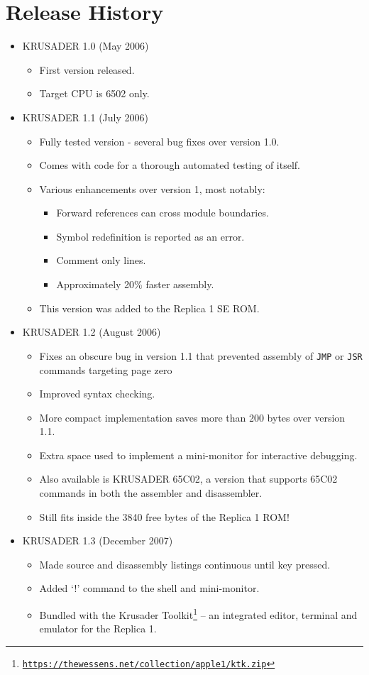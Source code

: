 \documentclass[12pt]{article}
\newcommand{\krusader}{\textsf{KRUSADER}\xspace}
\renewcommand{\url}[1]{\href{#1}{\texttt{#1}}}
\begin{document}
\pagebreak
	
\section{Release History}
\label{sec:history}

\begin{itemize}
	\item \krusader 1.0 (May 2006)
		\begin{itemize}
			\item First version released.
			\item Target CPU is 6502 only.
		\end{itemize}
	\item \krusader 1.1 (July 2006)
		\begin{itemize}
			\item Fully tested version - several bug fixes over version 1.0.
			\item Comes with code for a thorough automated testing of itself.
			\item Various enhancements over version 1, most notably:
			\begin{itemize}
				\item Forward references can cross module boundaries.
				\item Symbol redefinition is reported as an error.
				\item Comment only lines.
				\item Approximately 20\% faster assembly.
			\end{itemize}
			\item This version was added to the Replica 1 SE ROM.
		\end{itemize}
	\item \krusader 1.2 (August 2006)
		\begin{itemize}
			\item Fixes an obscure bug in version 1.1 that prevented assembly of \texttt{JMP}
				or \texttt{JSR} commands targeting page zero
			\item Improved syntax checking.
			\item More compact implementation saves more than 200 bytes over version 1.1.
			\item Extra space used to implement a mini-monitor for interactive debugging.
			\item Also available is KRUSADER 65C02, a version that supports 65C02
				commands in both the assembler and disassembler.
			\item Still fits inside the 3840 free bytes of the Replica 1 ROM!
		\end{itemize}
	\item \krusader 1.3 (December 2007)
		\begin{itemize}
			\item Made source and disassembly listings continuous until key pressed.
			\item  Added ‘!’ command to the shell and mini-monitor.
			\item Bundled with the Krusader Toolkit\footnote{\url{https://thewessens.net/collection/apple1/ktk.zip}} -- an integrated editor, terminal and emulator for the Replica 1.
		\end{itemize}
\end{itemize}
\end{document}
